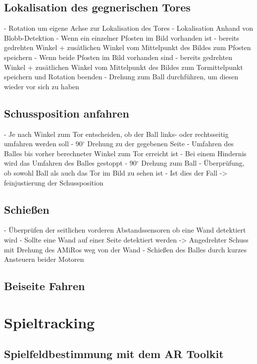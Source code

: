 \subsection{Lokalisation des gegnerischen Tores} %
- Rotation um eigene Achse zur Lokalisation des Tores
- Lokalisation Anhand von Blobb-Detektion 
- Wenn ein einzelner Pfosten im Bild vorhanden ist - bereits gedrehten Winkel + zusätlichen Winkel vom Mittelpunkt des Bildes zum Pfosten speichern
- Wenn beide Pfosten im Bild vorhanden sind - bereits gedrehten Winkel + zusätlichen Winkel vom Mittelpunkt des Bildes zum Tormittelpunkt speichern und Rotation beenden
- Drehung zum Ball durchführen, um diesen wieder vor sich zu haben

\subsection{Schussposition anfahren} %
- Je nach Winkel zum Tor entscheiden, ob der Ball links- oder rechtsseitig umfahren werden soll
- 90$^\circ$ Drehung zu der gegebenen Seite 
- Umfahren des Balles bis vorher berechneter Winkel zum Tor erreicht ist
	- Bei einem Hindernis wird das Umfahren des Balles gestoppt
- 90$^\circ$ Drehung zum Ball
- Überprüfung, ob sowohl Ball als auch das Tor im Bild zu sehen ist 
	- Ist dies der Fall -> feinjustierung der Schussposition 

\subsection{Schießen} %
- Überprüfen der seitlichen vorderen Abstandssensoren ob eine Wand detektiert wird
	- Sollte eine Wand auf einer Seite detektiert werden -> Angedrehter Schuss mit Drehung des AMiRos weg von der Wand
- Schießen des Balles durch kurzes Ansteuern beider Motoren 

\subsection{Beiseite Fahren} %

\section{Spieltracking} %

\subsection{Spielfeldbestimmung mit dem AR Toolkit} %

